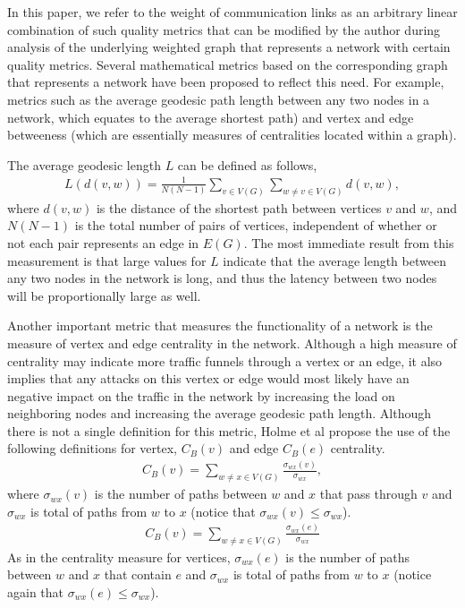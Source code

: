 \documentclass[doc]{apa}%
\begin{document}

In this paper, we refer to the weight of communication links as an arbitrary linear combination of such quality metrics that can be modified by the author during analysis of the underlying weighted graph that represents a network with certain quality metrics. Several mathematical metrics based on the corresponding graph that represents a network have been proposed to reflect this need. For example, metrics such as the average geodesic path length between any two nodes in a network, which equates to the average shortest path) and vertex and edge betweeness (which are essentially measures of centralities located within a graph). 

The average geodesic length $L$ can be defined as follows,
\begin{eqnarray*}
L(d(v,w)) = \frac{1}{N(N-1)}\sum_{v \in V(G)}\sum_{w \not= v \in V(G)} d(v,w),
\end{eqnarray*}
where $d(v,w)$ is the distance of the shortest path between vertices $v$ and $w$, and $N(N-1)$ is the total number of pairs of vertices, independent of whether or not each pair represents an edge in $E(G)$. The most immediate result from this measurement is that large values for $L$ indicate that the average length between any two nodes in the network is long, and thus the latency between two nodes will be proportionally large as well. 

Another important metric that measures the functionality of a network is the measure of vertex and edge centrality in the network. Although a high measure of centrality may indicate more traffic funnels through a vertex or an edge, it also implies that any attacks on this vertex or edge would most likely have an negative impact on the traffic in the network by increasing the load on neighboring nodes and increasing the average geodesic path length. Although there is not a single definition for this metric, Holme et al \cite{Attacks} propose the use of the following definitions for vertex, $C_{B}(v)$ and edge $C_{B}(e)$ centrality.
\begin{eqnarray*}
C_{B}(v) = \sum_{w \not= x \in V(G)} \frac{\sigma_{wx}(v)}{\sigma_{wx}},
\end{eqnarray*}
where $\sigma_{wx}(v)$ is the number of paths between $w$ and $x$ that pass through $v$ and $\sigma_{wx}$ is total of paths from $w$ to $x$ (notice that $\sigma_{wx}(v) \leq \sigma_{wx}$).
\begin{eqnarray*}
C_{B}(v) = \sum_{w \not= x \in V(G)} \frac{\sigma_{wx}(e)}{\sigma_{wx}}
\end{eqnarray*}
As in the centrality measure for vertices, $\sigma_{wx}(e)$ is the number of paths between $w$ and $x$ that contain $e$ and $\sigma_{wx}$ is total of paths from $w$ to $x$ (notice again that $\sigma_{wx}(e) \leq \sigma_{wx}$).
\end{document}

